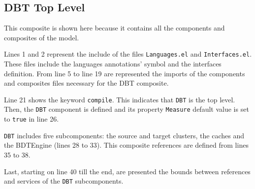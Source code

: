 \documentclass[11pt]{report}
\begin{document}
	\subsection*{DBT Top Level}
	
	\par This composite is shown here because it contains all the components and composites of the model.
	\par Lines 1 and 2 represent the include of the files \texttt{Languages.el} and \texttt{Interfaces.el}. These files include the languages annotations' symbol and the interfaces definition. From line 5 to line 19 are represented the imports of the components and composites files necessary for the DBT composite.
	\par Line 21 shows the keyword \texttt{compile}. This indicates that \texttt{DBT} is the top level. Then, the \texttt{DBT} component is defined and its property \texttt{Measure} default value is set to \texttt{true} in line 26.
	\par \texttt{DBT} includes five subcomponents: the source and target clusters, the caches and the BDTEngine (lines 28 to 33). This composite references are defined from lines 35 to 38.
	\par Last, starting on line 40 till the end, are presented the bounds between references and services of the \texttt{DBT} subcomponents.
\end{document}
